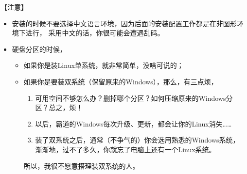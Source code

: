 \documentclass{wx672ctexart}
\begin{document}
\begin{enumerate}
【注意】
\begin{itemize}
\item 安装的时候不要选择中文语言环境，因为后面的安装配置工作都是在非图形环境下进行，
采用中文的话，你很可能会遭遇乱码。
\item 硬盘分区的时候，
\begin{itemize}
\item 如果你是装Linux单系统，就非常简单，没啥可说的；
\item 如果你是要装双系统（保留原来的Windows），那么，有三点烦，
\begin{enumerate}
\item 可用空间不够怎么办？删掉哪个分区？如何压缩原来的Windows分区？总之，烦！
\item 以后，霸道的Windows每次升级、更新，都会让你的Linux消失……
\item 装了双系统之后，通常（不争气的）你会选用熟悉的Windows系统，渐渐地，过不了多久，你就忘了电脑上还有一个Linux系统。
\end{enumerate}
所以，我很不愿意搭理装双系统的人。
\end{itemize}
\end{itemize}
\end{enumerate}
\end{document}
